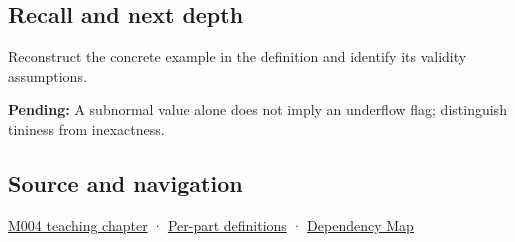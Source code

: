 \subsection{Recall and next depth}\label{appendix-00a6e044c437-recall-and-next-depth}

Reconstruct the concrete example in the definition and identify its validity assumptions.

\textbf{Pending:} A subnormal value alone does not imply an underflow flag; distinguish tininess from inexactness.

\subsection{Source and navigation}\label{appendix-00a6e044c437-source-and-navigation}

\hyperref[01-foundations-i-ch001-a-stretching-ruler-for-real-valued-quantities]{M004 teaching chapter} · \hyperref[appendix-fd090d982a15-m004---parts-61-76]{Per-part definitions} · \hyperref[appendix-4ad47bdd269a]{Dependency Map}
